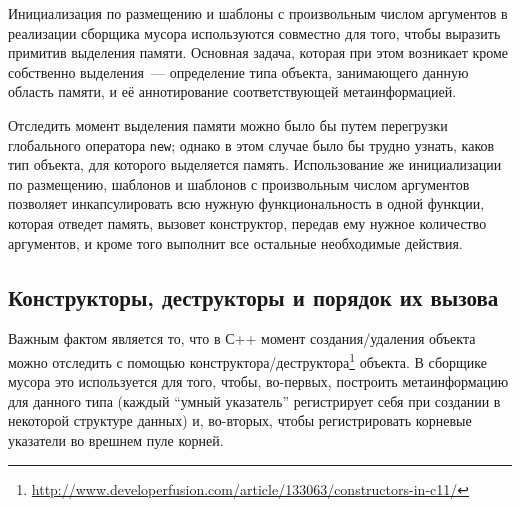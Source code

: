 Инициализация по размещению и шаблоны с произвольным числом аргументов в реализации сборщика мусора используются 
совместно для того, чтобы выразить примитив выделения памяти. Основная задача, которая при этом возникает 
кроме собственно выделения~--- определение типа объекта, занимающего данную область памяти, и её аннотирование
соответствующей метаинформацией. 

Отследить момент выделения памяти можно было бы путем перегрузки глобального оператора \lstinline{new}; однако
в этом случае было бы трудно узнать, каков тип объекта, для которого выделяется память. Использование же
инициализации по размещению, шаблонов и шаблонов с произвольным числом аргументов позволяет инкапсулировать
всю нужную функциональность в одной функции, которая отведет память, вызовет конструктор, передав
ему нужное количество аргументов, и кроме того выполнит все остальные необходимые действия.

 \subsection{Конструкторы, деструкторы и порядок их вызова} 

Важным фактом является то, что в С++ момент создания/удаления объекта можно отследить с помощью 
конструктора/деструктора\footnote{\url{http://www.developerfusion.com/article/133063/constructors-in-c11/}} объекта. 
В сборщике мусора это используется для того, чтобы, во-первых, построить метаинформацию для данного типа (каждый
``умный указатель'' регистрирует себя при создании в некоторой структуре данных) и, во-вторых, чтобы регистрировать
корневые указатели во врешнем пуле корней.
